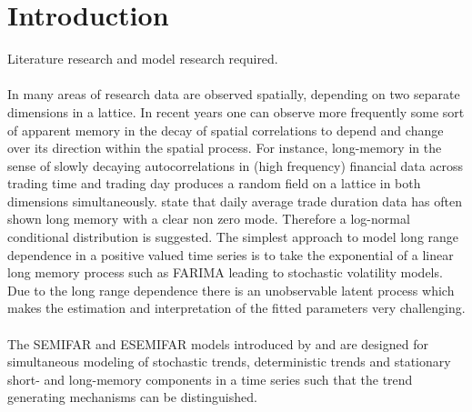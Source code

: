 \documentclass[12pt]{article}
\begin{document}
\section{Introduction}
Literature research and model research required.\\
\\ 
In many areas of research data are observed spatially, depending on two separate dimensions in a lattice. 
In recent years one can observe more frequently some sort of apparent memory in the decay of spatial correlations to depend and change over its direction within the spatial process. 
For instance, long-memory in the sense of slowly decaying autocorrelations in (high frequency) financial data across trading time and trading day produces a random field on a lattice in both dimensions simultaneously. 
\textcite{beran2015modelling}
state that daily average trade duration data has often shown long memory
with a clear non zero mode. Therefore a log-normal conditional distribution is suggested.
The simplest approach to model long range dependence in a positive valued
time series is to take the exponential of a linear long memory process such as
FARIMA leading to stochastic volatility models. Due to the long range dependence
there is an unobservable latent process which makes the estimation and interpretation
of the fitted parameters very challenging.\\
\\
The SEMIFAR and ESEMIFAR models introduced by \textcite{beran2002semifar} and \textcite{beran2015modelling} are designed for simultaneous modeling of stochastic trends, deterministic trends and stationary short- and long-memory components in a time series such that the trend generating mechanisms can be distinguished.
\end{document}
